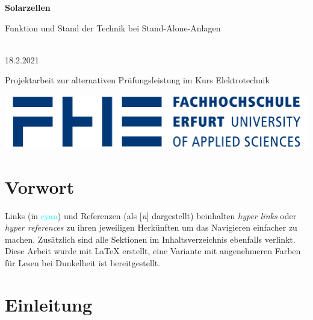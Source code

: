 \documentclass{article}
\begin{document}
    \begin{titlepage}
        \begin{center}
            \Huge
            \textbf{Solarzellen}

            \vspace{0.5cm}

            \LARGE
            Funktion und Stand der Technik bei Stand-Alone-Anlagen

            \vspace{1.5cm}

            \href{mailto:erik.buennig@fh-erfurt.de}{
            }\\
            18.2.2021

            \vfill

            \Large
            Projektarbeit zur alternativen Prüfungsleistung im Kurs Elektrotechnik

            \vspace{1.5cm}

            \href{https://www.fh-erfurt.de/fhe/}{
                \includegraphics[scale=0.5]{fhe_logo}
            }
        \end{center}
    \end{titlepage}

    \tableofcontents
    \thispagestyle{empty}
    \newpage


    \section{Vorwort}
        Links (in \textcolor{cyan}{cyan}) und Referenzen (als [\textit{n}]
        dargestellt) beinhalten \textit{hyper links} oder \textit{hyper references}
        zu ihren jeweiligen Herkünften um das Navigieren einfacher zu machen.
        Zusätzlich sind alle Sektionen im Inhaltsverzeichnis ebenfalls verlinkt.
        Diese Arbeit wurde mit \LaTeX{} erstellt, eine Variante mit angenehmeren
        Farben für Lesen bei Dunkelheit ist bereitgestellt.

    \section{Einleitung}
    
\end{document}
